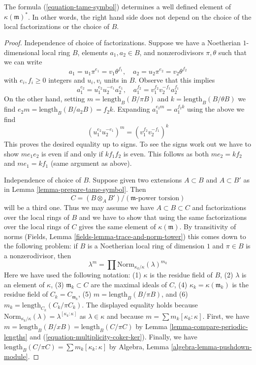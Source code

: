 \begin{lemma}
\label{lemma-well-defined-tame-symbol}
The formula (\ref{equation-tame-symbol}) determines a
well defined element of $\kappa(\mathfrak m)^*$. In other words, the
right hand side does not depend on the choice of the
local factorizations or the choice of $B$.
\end{lemma}

\begin{proof}
Independence of choice of factorizations. Suppose we have
a Noetherian $1$-dimensional local ring $B$, elements $a_1, a_2 \in B$,
and nonzerodivisors $\pi, \theta$ such that we can write
$$
a_1 = u_1 \pi^{e_1} = v_1 \theta^{f_1},\quad
a_2 = u_2 \pi^{e_2} = v_2 \theta^{f_2}
$$
with $e_i, f_i \geq 0$ integers and $u_i, v_i$ units in $B$.
Observe that this implies
$$
a_1^{e_2} = u_1^{e_2}u_2^{-e_1}a_2^{e_1},\quad
a_1^{f_2} = v_1^{f_2}v_2^{-f_1}a_2^{f_1}
$$
On the other hand, setting
$m = \text{length}_B(B/\pi B)$ and $k = \text{length}_B(B/\theta B)$
we find $e_2 m = \text{length}_B(B/a_2 B) = f_2 k$.
Expanding $a_1^{e_2m} = a_1^{f_2 k}$ using the above we find
$$
(u_1^{e_2}u_2^{-e_1})^m =  (v_1^{f_2}v_2^{-f_1})^k
$$
This proves the desired equality up to signs. To see the signs
work out we have to show $me_1e_2$ is even if and only if
$kf_1f_2$ is even. This follows as both $me_2 = kf_2$ and
$me_1 = kf_1$ (same argument as above).

\medskip\noindent
Independence of choice of $B$. Suppose given two extensions
$A \subset B$ and $A \subset B'$ as in Lemma \ref{lemma-prepare-tame-symbol}.
Then
$$
C = (B \otimes_A B')/(\mathfrak m\text{-power torsion})
$$
will be a third one. Thus we may assume we have
$A \subset B \subset C$ and factorizations over the
local rings of $B$ and we have to show that using
the same factorizations over the local rings of $C$
gives the same element of $\kappa(\mathfrak m)$.
By transitivity of norms
(Fields, Lemma \ref{fields-lemma-trace-and-norm-tower})
this comes down to the following problem:
if $B$ is a Noetherian local ring of dimension $1$
and $\pi \in B$ is a nonzerodivisor, then
$$
\lambda^m = \prod \text{Norm}_{\kappa_k/\kappa}(\lambda)^{m_k}
$$
Here we have used the following notation:
(1) $\kappa$ is the residue field of $B$,
(2) $\lambda$ is an element of $\kappa$,
(3) $\mathfrak m_k \subset C$ are the maximal ideals of $C$,
(4) $\kappa_k = \kappa(\mathfrak m_k)$ is the residue field of
$C_k = C_{\mathfrak m_k}$,
(5) $m = \text{length}_B(B/\pi B)$, and
(6) $m_k = \text{length}_{C_k}(C_k/\pi C_k)$.
The displayed equality holds because
$\text{Norm}_{\kappa_k/\kappa}(\lambda) = \lambda^{[\kappa_k : \kappa]}$
as $\lambda \in \kappa$ and because $m = \sum m_k[\kappa_k:\kappa]$.
First, we have $m = \text{length}_B(B/xB) = \text{length}_B(C/\pi C)$
by Lemma \ref{lemma-compare-periodic-lengths} 
and (\ref{equation-multiplicity-coker-ker}).
Finally, we have $\text{length}_B(C/\pi C) = \sum m_k[\kappa_k:\kappa]$
by Algebra, Lemma \ref{algebra-lemma-pushdown-module}.
\end{proof}

